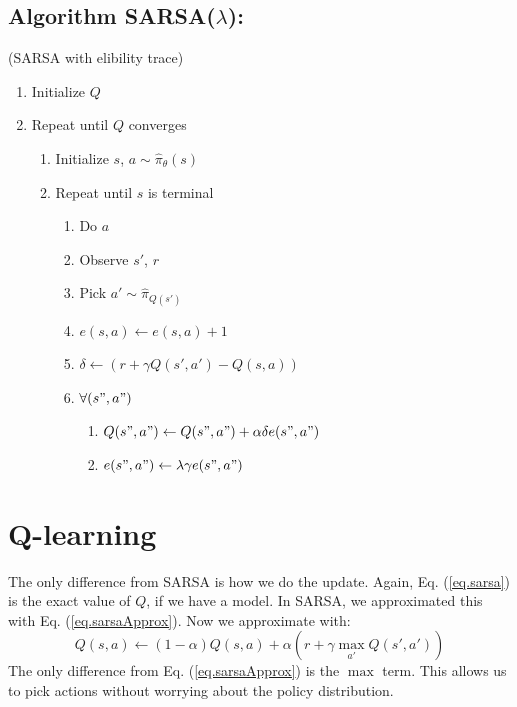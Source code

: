\documentclass[11pt]{article}
\numberwithin{equation}{section}
\numberwithin{figure}{section}
\begin{document}
\subsection*{Algorithm SARSA($\lambda$):}
(SARSA with elibility trace)
\begin{enumerate}
	\item Initialize $Q$
	\item Repeat until $Q$ converges
	\begin{enumerate}
		\item Initialize $s$, $a \sim \hat{\pi}_\theta(s)$
		\item Repeat until $s$ is terminal
		\begin{enumerate}
			\item Do $a$
			\item Observe $s'$, $r$
			\item Pick $a' \sim \hat{\pi}_{Q(s')}$
			\item $e(s,a) \leftarrow e(s,a) + 1$
			\item $\delta \leftarrow (r + \gamma Q(s',a') - Q(s,a))$
			\item $\forall (s",a")$
			\begin{enumerate}
				\item $Q(s",a") \leftarrow Q(s",a") + \alpha \delta e(s",a")$
				\item $e(s",a") \leftarrow \lambda \gamma e(s",a")$	
			\end{enumerate}
		\end{enumerate}
	\end{enumerate}
\end{enumerate}

\section{Q-learning}
The only difference from SARSA is how we do the update.  Again, Eq. (\ref{eq.sarsa}) is the exact value of $Q$, if we have a model.  In SARSA, we approximated this with Eq. (\ref{eq.sarsaApprox}).  Now we approximate with:
\begin{equation}
	Q(s,a) \leftarrow (1 - \alpha) Q(s,a) + \alpha(r + \gamma \max_{a'}Q(s',a'))
\end{equation}
The only difference from Eq. (\ref{eq.sarsaApprox}) is the $\max$ term.  This allows us to pick actions without worrying about the policy distribution.
\end{document}

